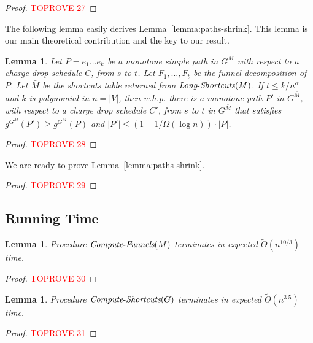 \documentclass[11pt]{article}
\newtheorem{lemma}[theorem]{Lemma}
\newcommand{\LS}{\mbox{{\it Long}-{\it Shortcuts}}}
\newcommand{\ComputeF}{\mbox{{\it Compute}-{\it Funnels}}}
\newcommand{\ComputeS}{\mbox{{\it Compute}-{\it Shortcuts}}}
\begin{document}
\begin{proof}\textcolor{red}{TOPROVE 27}\end{proof}



The following lemma easily derives Lemma~\ref{lemma:paths-shrink}. This lemma is our main theoretical contribution and the key to our result. 

\begin{lemma}\label{lemma:long-shortcuts-shrinks}
    Let $P = e_1 \ldots e_k$ be a monotone simple path in $G^M$ with respect to a charge drop schedule $C$, from $s$ to $t$. Let $F_1,\ldots, F_t$ be the funnel decomposition of $P$. Let $\bar{M}$ be the shortcuts table returned from $\LS(M)$. If $t \le k / n^\alpha $ and $k$ is polynomial in $n=|V|$, then w.h.p. there is a monotone path $P'$ in $G^{\bar{M}}$, with respect to a charge drop schedule $C'$, from $s$ to $t$ in $G^{\bar{M}}$ that satisfies $g^{G^{\bar{M}}}(P')\ge g^{G^M}(P)$ and $|P'| \le (1-1/\Omega(\log n))\cdot |P|$. 
\end{lemma}

\begin{proof}\textcolor{red}{TOPROVE 28}\end{proof}




We are ready to prove Lemma~\ref{lemma:paths-shrink}.

\begin{proof}\textcolor{red}{TOPROVE 29}\end{proof}


\subsection{Running Time}

\begin{lemma}\label{running-time-funnels}
    Procedure $\ComputeF(M)$ terminates in expected $\tilde{\Theta}(n^{10/3})$ time.
\end{lemma}

\begin{proof}\textcolor{red}{TOPROVE 30}\end{proof}

\begin{lemma}
    Procedure $\ComputeS(G)$ terminates in expected $\tilde{\Theta}(n^{3.5})$ time.
\end{lemma}

\begin{proof}\textcolor{red}{TOPROVE 31}\end{proof}
\end{document}
